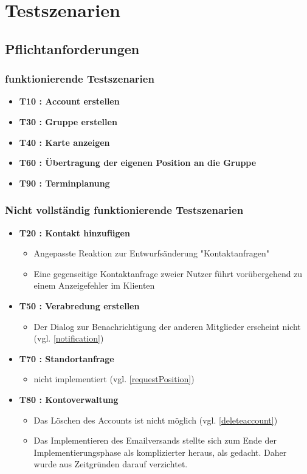 \documentclass[parskip=full,11pt]{scrartcl}
\begin{document}
\section{Testszenarien}

	\subsection{Pflichtanforderungen}
		\subsubsection{funktionierende Testszenarien}
			\begin{itemize}
				\item \textbf{T10 : Account erstellen}
				\item \textbf{T30 : Gruppe erstellen}
                \item \textbf{T40 : Karte anzeigen}
				\item \textbf{T60 : Übertragung der eigenen Position an die Gruppe}
				\item \textbf{T90 : Terminplanung}
			\end{itemize}

		\subsubsection{Nicht vollständig funktionierende Testszenarien}
			\begin{itemize}
				\item \textbf{T20 : Kontakt hinzufügen}
					\begin{itemize}
						\item Angepasste Reaktion zur Entwurfsänderung "Kontaktanfragen"
						\item Eine gegenseitige Kontaktanfrage zweier Nutzer führt
									vorübergehend zu einem Anzeigefehler im Klienten
					\end{itemize}
				\item \textbf{T50 : Verabredung erstellen}
					\begin{itemize}
						\item Der Dialog zur Benachrichtigung der anderen
                        Mitglieder erscheint nicht (vgl. \ref{notification})
					\end{itemize}
				\item \textbf{T70 : Standortanfrage}
					\begin{itemize}
						\item nicht implementiert (vgl. \ref{requestPosition})
					\end{itemize}
				\item \textbf{T80 : Kontoverwaltung}
					\begin{itemize}
            \item Das Löschen des Accounts ist nicht möglich
									(vgl. \ref{deleteaccount})
          	\item Das Implementieren des Emailversands stellte sich
                  zum Ende der Implementierungsphase als
                  komplizierter heraus, als gedacht. Daher wurde aus
                  Zeitgründen darauf verzichtet.
					\end{itemize}
				\end{itemize}
\end{document}

